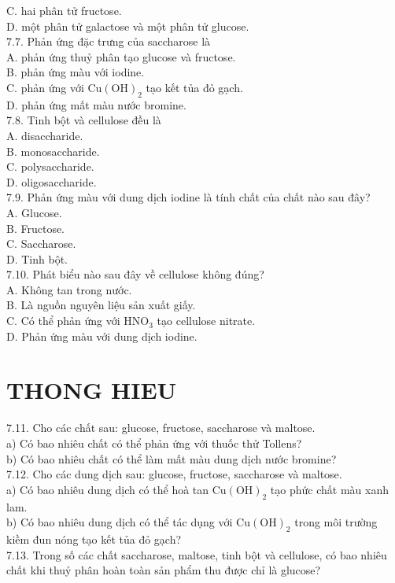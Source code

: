 \documentclass[10pt]{article}
\begin{document}
C. hai phân tử fructose.\\
D. một phân tử galactose và một phân tử glucose.\\
7.7. Phản ứng đặc trưng của saccharose là\\
A. phản ứng thuỷ phân tạo glucose và fructose.\\
B. phản ứng màu với iodine.\\
C. phản ứng với $\mathrm{Cu}(\mathrm{OH})_{2}$ tạo kết tủa đỏ gạch.\\
D. phản ứng mất màu nước bromine.\\
7.8. Tinh bột và cellulose đều là\\
A. disaccharide.\\
B. monosaccharide.\\
C. polysaccharide.\\
D. oligosaccharide.\\
7.9. Phản ứng màu với dung dịch iodine là tính chất của chất nào sau đây?\\
A. Glucose.\\
B. Fructose.\\
C. Saccharose.\\
D. Tinh bột.\\
7.10. Phát biểu nào sau đây về cellulose không đúng?\\
A. Không tan trong nước.\\
B. Là nguồn nguyên liệu sản xuất giấy.\\
C. Có thể phản ứng với $\mathrm{HNO}_{3}$ tạo cellulose nitrate.\\
D. Phản ứng màu với dung dịch iodine.

\section*{THONG HIEU}
7.11. Cho các chất sau: glucose, fructose, saccharose và maltose.\\
a) Có bao nhiêu chất có thể phản ứng với thuốc thử Tollens?\\
b) Có bao nhiêu chất có thể làm mất màu dung dịch nước bromine?\\
7.12. Cho các dung dịch sau: glucose, fructose, saccharose và maltose.\\
a) Có bao nhiêu dung dịch có thể hoà tan $\mathrm{Cu}(\mathrm{OH})_{2}$ tạo phức chất màu xanh lam.\\
b) Có bao nhiêu dung dịch có thể tác dụng với $\mathrm{Cu}(\mathrm{OH})_{2}$ trong môi trường kiềm đun nóng tạo kết tủa đỏ gạch?\\
7.13. Trong số các chất saccharose, maltose, tinh bột và cellulose, có bao nhiêu chất khi thuỷ phân hoàn toàn sản phẩm thu được chỉ là glucose?
\end{document}
